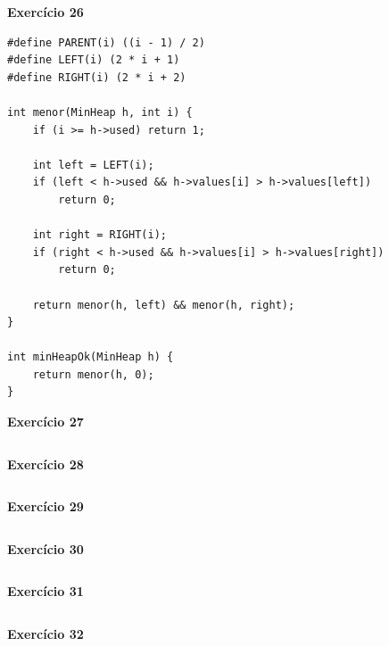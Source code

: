 \documentclass[a4paper,11pt]{article}
\begin{document}
\noindent \textbf{Exercício 26}

\begin{verbatim}
#define PARENT(i) ((i - 1) / 2)
#define LEFT(i) (2 * i + 1)
#define RIGHT(i) (2 * i + 2)

int menor(MinHeap h, int i) {
	if (i >= h->used) return 1;
	
	int left = LEFT(i);
	if (left < h->used && h->values[i] > h->values[left])
		return 0;
	
	int right = RIGHT(i);
	if (right < h->used && h->values[i] > h->values[right])
		return 0;
	
	return menor(h, left) && menor(h, right);
}

int minHeapOk(MinHeap h) {
	return menor(h, 0);
}
\end{verbatim}

\noindent \textbf{Exercício 27}

\begin{verbatim}
\end{verbatim}

\noindent \textbf{Exercício 28}

\begin{verbatim}
\end{verbatim}

\noindent \textbf{Exercício 29}

\begin{verbatim}
\end{verbatim}

\noindent \textbf{Exercício 30}

\begin{verbatim}
\end{verbatim}

\noindent \textbf{Exercício 31}

\begin{verbatim}
\end{verbatim}

\noindent \textbf{Exercício 32}

\begin{verbatim}
\end{verbatim}
\end{document}
